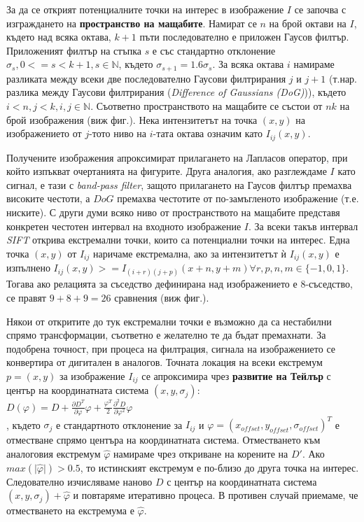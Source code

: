 \documentclass[a4paper,12pt]{article}
\begin{document}
За да се открият потенциалните точки на интерес в изображение $I$ се започва с изграждането на \textbf{пространство на мащабите}. Намират се $n$ на брой октави на $I$, където над всяка октава, $k+1$ пъти последователно е приложен Гаусов филтър. Приложеният филтър на стъпка $s$ е със стандартно отклонение $\sigma_s, 0 <= s < k+1, s \in \mathbb{N}$, където $\sigma_{s+1} = 1.6 \sigma_s$. За всяка октава $i$ намираме разликата между всеки две последователно Гаусови филтрирания $j$ и $j+1$ (т.нар. разлика между Гаусови филтрирания (\textit{Difference of Gaussians (DoG)})), където $i < n, j < k, i, j \in \mathbb{N}$. Съответно пространството на мащабите се състои от $nk$ на брой изображения (виж фиг.). Нека интензитетът на точка $(x, y)$ на изображението от $j$-тото ниво на $i$-тата октава означим като $I_{ij}(x,y)$.

\bigbreak

Получените изображения апроксимират прилагането на Лапласов оператор, при който изпъкват очертанията на фигурите. Друга аналогия, ако разглеждаме $I$ като сигнал, е тази с \textit{band-pass filter}, защото прилагането на Гаусов филтър премахва високите честоти, а $DoG$ премахва честотите от по-замъгленото изображение (т.е. ниските). С други думи всяко ниво от пространството на мащабите представя конкретен честотен интервал на входното изображение $I$. За всеки такъв интервал \textit{SIFT} открива екстремални точки, които са потенциални точки на интерес. Една точка $(x, y)$ от $I_{ij}$ наричаме екстремална, ако за интензитетът ѝ $I_{ij}(x, y)$ е изпълнено $I_{ij}(x, y) >= I_{(i+r)(j+p)}(x+n, y+m) \forall r,p,n,m \in \{-1, 0, 1\}$. Тогава ако релацията за съседство дефинирана над изображението е $8$-съседство, се правят $9+8+9=26$ сравнения (виж фиг.).

\bigbreak

Някои от откритите до тук екстремални точки е възможно да са нестабилни спрямо трансформации, съответно е желателно те да бъдат премахнати. За подобрена точност, при процеса на филтрация, сигнала на изображението се конвертира от дигитален в аналогов. Точната локация на всеки екстремум $p=(x, y)$ за изображение $I_{ij}$ се апроксимира чрез \textbf{развитие на Тейлър} с център на координатната система $(x, y, \sigma_j)$: \\

$D(\varphi) = D + \frac{\partial D^T}{\partial \varphi}\varphi + \frac{\varphi^T}{2}\frac{\partial^2 D}{\partial \varphi^2}\varphi$ \\

, където $\sigma_j$ е стандартното отклонение за $I_{ij}$ и $\varphi=(x_{offset},y_{offset},\sigma_{offset})^T$ е отместване спрямо центъра на координатната система. Отместването към аналоговия екстремум $\hat{\varphi}$ намираме чрез откриване на корените на $D'$. Ако $max(\lvert\hat{\varphi}\rvert) > 0.5$, то истинският екстремум е по-близо до друга точка на интерес. Следователно изчисляваме наново $D$ с център на координатната система $(x, y, \sigma_j) + \hat{\varphi}$ и повтаряме итеративно процеса. В противен случай приемаме, че отместването на екстремума е $\hat{\varphi}$.
\end{document}
